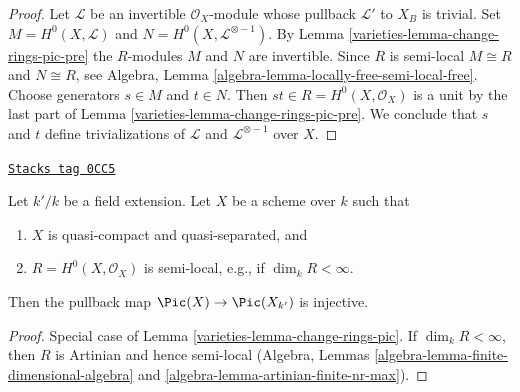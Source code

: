 \begin{proof}

Let $\mathcal{L}$ be an invertible $\mathcal{O}_X$-module
whose pullback $\mathcal{L}'$ to $X_B$ is trivial.
Set $M = H^0(X, \mathcal{L})$ and $N = H^0(X, \mathcal{L}^{\otimes - 1})$.
By Lemma \ref{varieties-lemma-change-rings-pic-pre} the $R$-modules $M$ and $N$ are
invertible. Since $R$ is semi-local $M \cong R$ and $N \cong R$, see
Algebra, Lemma \ref{algebra-lemma-locally-free-semi-local-free}.
Choose generators $s \in M$ and $t \in N$. Then
$st \in R = H^0(X, \mathcal{O}_X)$ is a unit by the last part
of Lemma \ref{varieties-lemma-change-rings-pic-pre}.
We conclude that $s$ and $t$ define trivializations of $\mathcal{L}$ and
$\mathcal{L}^{\otimes -1}$ over $X$.
\end{proof}

\begin{lemma}
\label{varieties-lemma-change-fields-pic}
\href{https://stacks.math.columbia.edu/tag/0CC5}{\texttt{Stacks tag 0CC5}}

Let $k'/k$ be a field extension.
Let $X$ be a scheme over $k$ such that
\begin{enumerate}
\item $X$ is quasi-compact and quasi-separated, and
\item $R = H^0(X, \mathcal{O}_X)$ is semi-local, e.g., if $\dim_k R < \infty$.
\end{enumerate}
Then the pullback map $\Pic(X) \to \Pic(X_{k'})$ is injective.
\end{lemma}

\begin{proof}

Special case of Lemma \ref{varieties-lemma-change-rings-pic}.
If $\dim_k R < \infty$, then
$R$ is Artinian and hence semi-local (Algebra, Lemmas
\ref{algebra-lemma-finite-dimensional-algebra} and
\ref{algebra-lemma-artinian-finite-nr-max}).
\end{proof}

